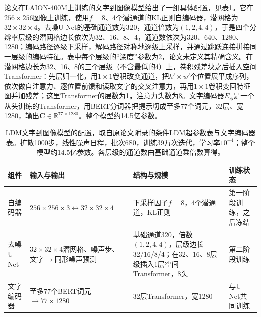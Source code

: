 论文在LAION-400M上训练的文字到图像模型给出了一组具体配置，见表\ref{tab:vision-models-ldm-config}。它在$256\times256$图像上训练，使用$f=8$、4个潜通道的KL正则自编码器，潜网格为$32\times32\times4$。去噪U-Net的基础通道数为320，通道倍数为$(1,2,4,4)$，于是四个分辨率层级的潜网格边长依次为32、16、8、4，通道数依次为320、640、1280、1280；编码路径逐级下采样，解码路径对称地逐级上采样，并通过跳跃连接拼接同一层级的编码特征。表中每个层级的“深度”参数为2，论文未定义其精确含义。在潜网格边长为32、16、8的三个层级（不含最低的4）上，卷积残差块之后插入空间Transformer：先层归一化，用$1\times1$卷积改变通道，把$h'\times w'$个位置展平成序列，依次做自注意力、逐位置前馈和读取文字的交叉注意力，再用$1\times1$卷积变回特征图并加残差；这里Transformer的层数为1，注意力头数为8。文字编码器$E_{\bm\phi}$是一个从头训练的Transformer，用BERT分词器把提示切成至多77个词元，32层、宽1280，输出$\bm C\in\mathbb R^{77\times1280}$。整个模型约14.5亿参数。

\begin{table}[htbp]
  \centering
  \small
  \begin{tabularx}{\linewidth}{@{}p{14mm}XXp{14mm}@{}}
    \toprule
    组件 & 输入与输出 & 结构与规模 & 训练状态\\
    \midrule
    自编码器 & $256\times256\times3\leftrightarrow32\times32\times4$ & 下采样因子$f=8$，4个潜通道，KL正则 & 第一阶段训练，之后冻结\\
    去噪U-Net & $32\times32\times4$潜网格、噪声步、文字$\to$同形噪声预测 & 基础通道320，倍数$(1,2,4,4)$，层级边长32/16/8/4；在32、16、8层级插入1层空间Transformer，8头 & 第二阶段训练\\
    文字编码器 & 至多77个BERT词元$\to77\times1280$ & 32层Transformer，宽1280 & 与U-Net共同训练\\
    \bottomrule
  \end{tabularx}
  \caption{LDM文字到图像模型的配置，取自原论文附录的条件LDM超参数表与文字编码器表。扩散1000步，线性噪声日程，批次680，训练39万次迭代，学习率$10^{-4}$；整个模型约14.5亿参数。各层级的通道数由基础通道乘倍数算得。}
  \label{tab:vision-models-ldm-config}
\end{table}

